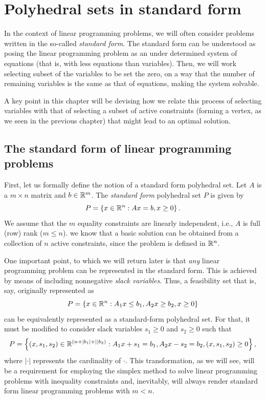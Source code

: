 \section{Polyhedral sets in standard form}

In the context of linear programming problems, we will often consider problems written in the so-called \emph{standard form}. The standard form can be understood as posing the linear programming problem as an under determined system of equations (that is, with less equations than variables). Then, we will work selecting subset of the variables to be set the zero, on a way that the number of remaining variables is the same as that of equations, making the system solvable. 

A key point in this chapter will be devising how we relate this process of selecting variables with that of selecting a subset of active constraints (forming a vertex, as we seen in the previous chapter) that might lead to an optimal solution. 


\subsection{The standard form of linear programming problems}

First, let us formally define the notion of a standard form polyhedral set. Let $A$ is a $m \times n$ matrix and $b \in \mathbb{R}^m$. The \emph{standard form} polyhedral set $P$ is given by 
%
\begin{equation*}
	P = \left\{ x \in \mathbb{R}^n : Ax = b, x \geq 0 \right \}.		
\end{equation*}
%
We assume that the $m$ equality constraints are linearly independent, i.e., $A$ is full (row) rank ($m \leq n$). we know that a basic solution can be obtained from a collection of $n$ active constraints, since the problem is defined in $\mathbb{R}^n$. 

One important point, to which we will return later is that \emph{any} linear programming problem can be represented in the standard form. This is achieved by means of including nonnegative \emph{slack variables}. Thus, a feasibility set that is, say, originally represented as
%
\begin{equation*}
	P = \left\{ x \in \mathbb{R}^n : A_1 x \le b_1, A_2x \ge b_2, x \ge 0 \right \}
\end{equation*}
%
can be equivalently represented as a standard-form polyhedral set. For that, it must be modified to consider slack variables $s_1 \ge 0$ and $s_2 \geq 0$ such that
%
\begin{equation*}
	P = \left\{ (x, s_1, s_2) \in \mathbb{R}^{(n + |b_1| + ||b_2)} : A_1 x + s_1 = b_1, A_2x - s_2 = b_2, (x, s_1, s_2) \ge 0 \right \},
\end{equation*}
%
where $|\cdot|$ represents the cardinality of $\cdot$. This transformation, as we will see, will be a requirement for employing the simplex method to solve linear programming problems with inequality constraints and, inevitably, will always render standard form linear programming problems with $m < n$.

